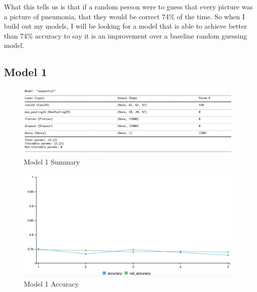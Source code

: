 \documentclass[12pt]{article}
\begin{document}
What this tells us is that if a random person were to guess that every
picture was a picture of pneumonia, that they would be correct 74\% of
the time. So when I build out my models, I will be looking for a model
that is able to achieve better than 74\% accuracy to say it is an
improvement over a baseline random guessing model.

\hypertarget{model-1}{%
\subsection{Model 1}\label{model-1}}

\begin{figure}

{\centering \includegraphics[width=0.75\linewidth,height=0.25\textheight]{images/model1} 

}

\caption{Model 1 Summary}\label{fig:sample-fig6}
\end{figure}

\begin{figure}

{\centering \includegraphics[width=0.75\linewidth,height=0.25\textheight]{images/model1out} 

}

\caption{Model 1 Accuracy}\label{fig:sample-fig7}
\end{figure}
\end{document}
